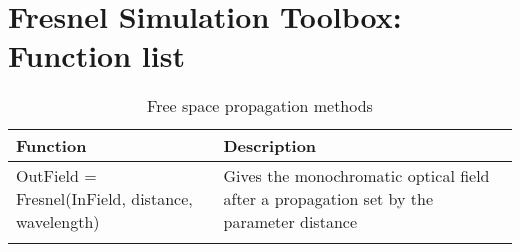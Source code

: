 \chapter*{Fresnel Simulation Toolbox: Function list}
\begin{table}
	\centering
	\label{tab:methods}
	\begin{tabular} { l | p{4cm}}
		Function & Description \\ \hline 
		OutField = Fresnel(InField, distance, wavelength) & Gives the monochromatic optical field after a propagation set by the parameter distance \\ \hline\\ \hline
		
		
	\end{tabular}
	\caption{Free space propagation methods}
\end{table}